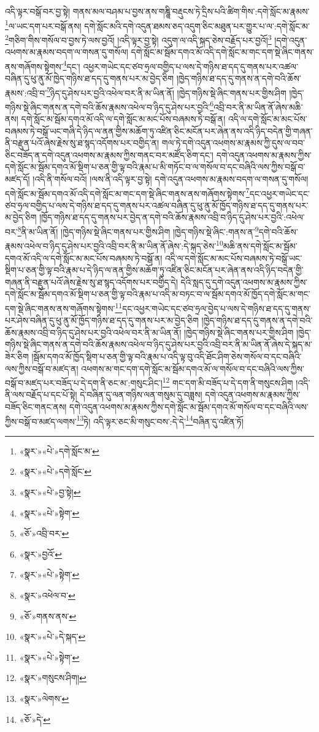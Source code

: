 འདི་ལྟར་བསྒོ་བར་བྱ་སྟེ། གནས་མལ་བཤམ་པ་བྱས་ནས་གཎྜཱི་བརྡུངས་ཏེ་དྲིས་པའི་ཚིག་གིས་:དགེ་སློང་མ་རྣམས་\footnote{«སྣར་»«པེ་»དགེ་སློང་མ་}ལ་ཡང་དག་པར་བསྒོ་ནས། དགེ་སློང་མའི་དགེ་འདུན་ཐམས་ཅད་འདུག་ཅིང་མཐུན་པར་གྱུར་པ་ལ་:དགེ་སློང་མ་\footnote{«སྣར་»«པེ་»དགེ་སློང་}གཅིག་གིས་གསོལ་བ་བྱས་ཏེ་ལས་བྱའོ། །འདི་ལྟར་བྱ་སྟེ། འདུག་ལ་འདི་སྐད་ཅེས་བརྗོད་པར་བྱའོ།\footnote{«སྣར་»«པེ་»བྱ་སྟེ།} །དགེ་འདུན་འཕགས་མ་རྣམས་བདག་ལ་གསན་དུ་གསོལ། དགེ་སློང་མ་སྦོམ་དགའ་མོ་འདི་དགེ་སློང་མ་གང་དག་སྡེ་ཞིང་གནས་ནས་གཞོགས་སྟེགས་\footnote{«སྣར་»«པེ་»སྟེག་}དང་། འཕྱར་གཡེང་དང་ཙབ་ཧྲལ་བགྱིད་པ་ལས་དེ་གཉིས་ཐ་དད་དུ་གནས་པར་འཚལ་བཞིན་དུ་ཕུ་ནུ་མོ་ཁྱེད་གཉིས་ཐ་དད་དུ་གནས་པར་མ་བྱེད་ཅིག །ཁྱེད་གཉིས་ཐ་དད་དུ་གནས་ན་དགེ་བའི་ཆོས་རྣམས་:འབྲི་བ་\footnote{«ཅོ་»འབྲི་བར་}ཉིད་དུ་ཤེས་པར་བྱའི་འཕེལ་བར་ནི་མ་ཡིན་ནོ། །ཁྱེད་གཉིས་སྡེ་ཞིང་གནས་པར་གྱིས་ཤིག །ཁྱེད་གཉིས་སྡེ་ཞིང་གནས་ན་དགེ་བའི་ཆོས་རྣམས་འཕེལ་བ་ཉིད་དུ་ཤེས་པར་བྱའི་\footnote{«སྣར་»བྱའོ་}འབྲི་བར་ནི་མ་ཡིན་ནོ་ཞེས་མཆི་ནས། དགེ་སློང་མ་སྦོམ་དགའ་མོ་འདི་ལ་དགེ་སློང་མ་མང་པོས་བཞམས་ཏེ་བསྒོ་ན། འདི་ལ་དགེ་སློང་མ་མང་པོས་བཞམས་ཏེ་བསྒོ་ཡང་གཞི་དེ་ཉིད་ལ་ནན་གྱིས་མཆོག་ཏུ་འཛིན་ཅིང་མངོན་པར་ཞེན་ནས་འདི་ཉིད་བདེན་གྱི་གཞན་ནི་བརྫུན་པའོ་ཞེས་རྗེས་སུ་ཐ་སྙད་འདོགས་པར་བགྱིད་ན། གལ་ཏེ་དགེ་འདུན་འཕགས་མ་རྣམས་ཀྱི་དུས་ལ་བབ་ཅིང་བཟོད་ན་དགེ་འདུན་འཕགས་མ་རྣམས་ཀྱིས་གནང་བར་མཛོད་ཅིག་དང་། དགེ་འདུན་འཕགས་མ་རྣམས་ཀྱིས་དགེ་སློང་མ་སྦོམ་དགའ་མོ་སྡིག་པ་ཅན་གྱི་ལྟ་བའི་རྣམ་པ་མི་གཏོང་བ་ལ་གསོལ་བ་དང་བཞིའི་ལས་ཀྱིས་བསྒོ་བ་མཛད་དོ། །འདི་ནི་གསོལ་བའོ། །ལས་ནི་འདི་ལྟར་བྱ་སྟེ། དགེ་འདུན་འཕགས་མ་རྣམས་བདག་ལ་གསན་དུ་གསོལ། དགེ་སློང་མ་སྦོམ་དགའ་མོ་འདི་དགེ་སློང་མ་གང་དག་སྡེ་ཞིང་གནས་ནས་གཞོགས་སྟེགས་\footnote{«སྣར་»«པེ་»སྟེག་}དང་འཕྱར་གཡེང་དང་ཙབ་ཧྲལ་བགྱིད་པ་ལས་དེ་གཉིས་ཐ་དད་དུ་གནས་པར་འཚལ་བཞིན་དུ་ཕུ་ནུ་མོ་ཁྱོད་གཉིས་ཐ་དད་དུ་གནས་པར་མ་བྱེད་ཅིག །ཁྱོད་གཉིས་ཐ་དད་དུ་གནས་པར་བྱེད་ན་དགེ་བའི་ཆོས་རྣམས་འབྲི་བ་ཉིད་དུ་ཤེས་པར་བྱའི་:འཕེལ་བར་\footnote{«སྣར་»འཕེལ་བ་}ནི་མ་ཡིན་ནོ། །ཁྱེད་གཉིས་སྡེ་ཞིང་གནས་པར་གྱིས་ཤིག །ཁྱེད་གཉིས་སྡེ་ཞིང་:གནས་ན་\footnote{«ཅོ་»གནས་ནས་}དགེ་བའི་ཆོས་རྣམས་འཕེལ་བ་ཉིད་དུ་ཤེས་པར་བྱའི་འབྲི་བར་ནི་མ་ཡིན་ནོ་ཞེས་:དེ་སྐད་ཅེས་\footnote{«སྣར་»«པེ་»དེ་སྐད་}མཆི་ནས་དགེ་སློང་མ་སྦོམ་དགའ་མོ་འདི་ལ་དགེ་སློང་མ་མང་པོས་བཞམས་ཏེ་བསྒོ་ན། འདི་ལ་དགེ་སློང་མ་མང་པོས་བཞམས་ཏེ་བསྒོ་ཡང་སྡིག་པ་ཅན་གྱི་ལྟ་བའི་རྣམ་པ་དེ་ཉིད་ལ་ནན་གྱིས་མཆོག་ཏུ་འཛིན་ཅིང་མངོན་པར་ཞེན་ནས་འདི་ཉིད་བདེན་གྱི་གཞན་ནི་བརྫུན་པའོ་ཞེས་རྗེས་སུ་ཐ་སྙད་འདོགས་པར་བགྱིད་དེ། དེའི་སླད་དུ་དགེ་འདུན་འཕགས་མ་རྣམས་ཀྱིས་དགེ་སློང་མ་སྦོམ་དགའ་མོ་སྡིག་པ་ཅན་གྱི་ལྟ་བའི་རྣམ་པ་འདི་མ་བཏང་བ་ལ་སྦོམ་དགའ་མོ་ཁྱོད་དགེ་སློང་མ་གང་དག་སྡེ་ཞིང་གནས་ནས་གཞོགས་སྟེགས་\footnote{«སྣར་»«པེ་»སྟེག་}དང་འཕྱར་གཡེང་དང་ཙབ་ཧྲལ་བྱེད་པ་ལས་དེ་གཉིས་ཐ་དད་དུ་གནས་པར་ཤེས་བཞིན་དུ་ཕུ་ནུ་མོ་ཁྱོད་གཉིས་ཐ་དད་དུ་གནས་པར་མ་བྱེད་ཅིག །ཁྱེད་གཉིས་ཐ་དད་དུ་གནས་ན་དགེ་བའི་ཆོས་རྣམས་འབྲི་བ་ཉིད་དུ་ཤེས་པར་བྱའི་འཕེལ་བར་ནི་མ་ཡིན་ནོ། །ཁྱེད་གཉིས་སྡེ་ཞིང་གནས་པར་གྱིས་ཤིག །ཁྱེད་གཉིས་སྡེ་ཞིང་གནས་ན་དགེ་བའི་ཆོས་རྣམས་འཕེལ་བ་ཉིད་དུ་ཤེས་པར་བྱའི་འབྲི་བར་ནི་མ་ཡིན་ནོ་ཞེས་དེ་སྐད་མ་ཟེར་ཅིག །སྦོམ་དགའ་མོ་ཁྱོད་སྡིག་པ་ཅན་གྱི་ལྟ་བའི་རྣམ་པ་འདི་ལྟ་བུ་འདི་ཐོང་ཤིག་ཅེས་གསོལ་བ་དང་བཞིའི་ལས་ཀྱིས་བསྒོ་བ་མཛད་ན། འཕགས་མ་གང་དག་དགེ་སློང་མ་སྦོམ་དགའ་མོ་ལ་གསོལ་བ་དང་བཞིའི་ལས་ཀྱིས་བསྒོ་བ་མཛད་པར་བཟོད་པ་དེ་དག་ནི་ཅང་མ་:གསུང་ཤིང་།\footnote{«སྣར་»གསུངས་ཤིག།} གང་དག་མི་བཟོད་པ་དེ་དག་ནི་གསུངས་ཤིག །འདི་ནི་ལས་བརྗོད་པ་དང་པོ་སྟེ། དེ་བཞིན་དུ་ལན་གཉིས་ལན་གསུམ་དུ་བཟླས། དགེ་འདུན་འཕགས་མ་རྣམས་ཀྱིས་བཟོད་ཅིང་གནང་ནས། དགེ་འདུན་འཕགས་མ་རྣམས་ཀྱིས་དགེ་སློང་མ་སྦོམ་དགའ་མོ་གསོལ་བ་དང་བཞིའི་ལས་ཀྱིས་བསྒོ་བ་མཛད་ལགས་\footnote{«སྣར་»ལེགས་}ཏེ། འདི་ལྟར་ཅང་མི་གསུང་བས་:དེ་དེ་\footnote{«ཅོ་»དེ་}བཞིན་དུ་འཛིན་ཏོ། 